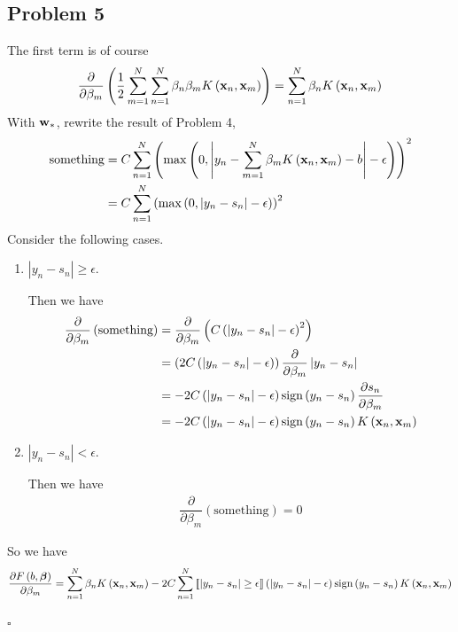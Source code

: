 \documentclass[12pt]{article}
\newcommand*{\QEDB}{\hfill\ensuremath{\square}}
\newcommand{\BooBrackets}[1]{\left\llbracket#1\right\rrbracket}
\newcommand{\ParTh}[1]{\left(#1\right)}
\newcommand{\BF}[1]{{\bf#1}}
\newcommand{\AbsVal}[1]{\left|#1\right|}
\begin{document}
\subsection*{Problem 5}

The first term is of course
\begin{align}
\dfrac{\partial}{\partial\beta_m}\ParTh{\dfrac{1}{2}\sum_{m=1}^{N}\sum_{n=1}^{N}\beta_n\beta_mK\ParTh{\BF{x}_n,\BF{x}_m}}=\sum_{n=1}^{N}\beta_nK\ParTh{\BF{x}_n,\BF{x}_m}
\end{align}
With $\BF{w}_*$, rewrite the result of Problem 4,
\begin{align}
\text{something}&=C\sum_{n=1}^{N}\ParTh{\max\ParTh{0,\AbsVal{y_n-\sum_{m=1}^{N}\beta_mK\ParTh{\BF{x}_n,\BF{x}_m}-b}-\epsilon}}^2\\
&=C\sum_{n=1}^{N}\ParTh{\max\ParTh{0,\AbsVal{y_n-s_n}-\epsilon}}^2
\end{align}
Consider the following cases.
\begin{enumerate}
	\item $\AbsVal{y_n-s_n}\geq\epsilon$.
	
	Then we have
	\begin{align}
	\dfrac{\partial}{\partial\beta_m}\ParTh{\text{something}}&=\dfrac{\partial}{\partial\beta_m}\ParTh{C\ParTh{\AbsVal{y_n-s_n}-\epsilon}^2}\\
	&=\ParTh{2C\ParTh{\AbsVal{y_n-s_n}-\epsilon}}\dfrac{\partial}{\partial\beta_m}\AbsVal{y_n-s_n}\\
	&=-2C\ParTh{\AbsVal{y_n-s_n}-\epsilon}\text{sign}\ParTh{y_n-s_n}\dfrac{\partial s_n}{\partial\beta_m}\\
	&=-2C\ParTh{\AbsVal{y_n-s_n}-\epsilon}\text{sign}\ParTh{y_n-s_n}K\ParTh{\BF{x}_n,\BF{x}_m}
	\end{align}
	\item $\AbsVal{y_n-s_n}<\epsilon$.
	
	Then we have
	\begin{align}
	\dfrac{\partial}{\partial\beta_m}\ParTh{\text{something}}=0
	\end{align}
\end{enumerate}
So we have
\begin{align}
\dfrac{\partial F\ParTh{b,\bm{\beta}}}{\partial\beta_m}=\sum_{n=1}^{N}\beta_nK\ParTh{\BF{x}_n,\BF{x}_m}-2C\sum_{n=1}^{N}\BooBrackets{\AbsVal{y_n-s_n}\geq\epsilon}\ParTh{\AbsVal{y_n-s_n}-\epsilon}\text{sign}\ParTh{y_n-s_n}K\ParTh{\BF{x}_n,\BF{x}_m}
\end{align}

\QEDB
\end{document}
